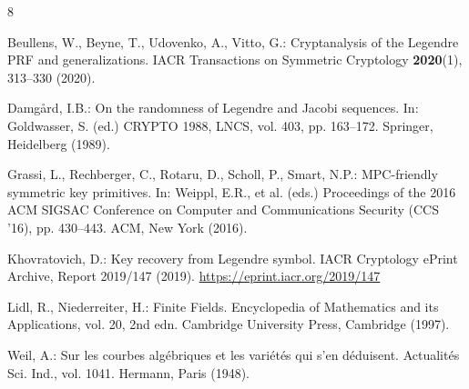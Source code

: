 \documentclass[runningheads]{llncs}
\begin{document}
\begin{thebibliography}{8}

Beullens, W., Beyne, T., Udovenko, A., Vitto, G.: Cryptanalysis of the Legendre PRF and generalizations. IACR Transactions on Symmetric Cryptology \textbf{2020}(1), 313--330 (2020). 

Damgård, I.B.: On the randomness of Legendre and Jacobi sequences. In: Goldwasser, S. (ed.) CRYPTO 1988, LNCS, vol. 403, pp. 163--172. Springer, Heidelberg (1989). 

Grassi, L., Rechberger, C., Rotaru, D., Scholl, P., Smart, N.P.: MPC-friendly symmetric key primitives. In: Weippl, E.R., et al. (eds.) Proceedings of the 2016 ACM SIGSAC Conference on Computer and Communications Security (CCS '16), pp. 430--443. ACM, New York (2016). 

Khovratovich, D.: Key recovery from Legendre symbol. IACR Cryptology ePrint Archive, Report 2019/147 (2019). \url{https://eprint.iacr.org/2019/147}

Lidl, R., Niederreiter, H.: Finite Fields. Encyclopedia of Mathematics and its Applications, vol. 20, 2nd edn. Cambridge University Press, Cambridge (1997).

Weil, A.: Sur les courbes alg\'{e}briques et les vari\'{e}t\'{e}s qui s'en d\'{e}duisent. Actualit\'{e}s Sci. Ind., vol. 1041. Hermann, Paris (1948).

\end{thebibliography}
\end{document}

